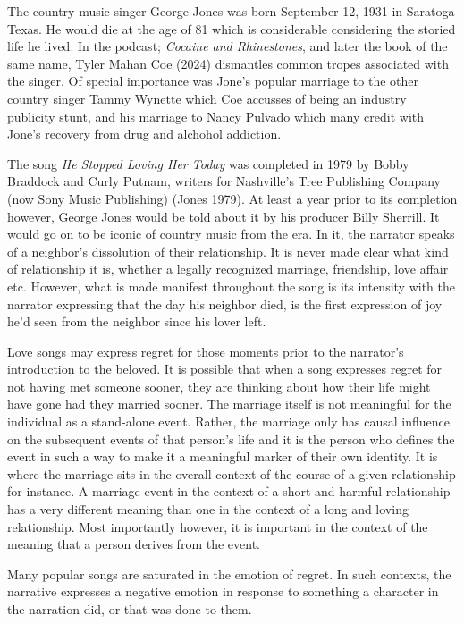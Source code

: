 \documentclass[
  letterpaper,
  DIV=11,
  numbers=noendperiod]{scrreprt}
\begin{document}
\begin{tcolorbox}[enhanced jigsaw, arc=.35mm, breakable, rightrule=.15mm, colback=white, colframe=quarto-callout-important-color-frame, bottomrule=.15mm, leftrule=.75mm, opacityback=0, toprule=.15mm, left=2mm]
\begin{tcolorbox}[enhanced jigsaw, arc=.35mm, breakable, rightrule=.15mm, colback=white, colframe=quarto-callout-tip-color-frame, bottomrule=.15mm, leftrule=.75mm, opacityback=0, toprule=.15mm, left=2mm]
The country music singer George Jones was born September 12, 1931 in
Saratoga Texas. He would die at the age of 81 which is considerable
considering the storied life he lived. In the podcast; \emph{Cocaine and
Rhinestones}, and later the book of the same name, Tyler Mahan Coe
(2024) dismantles common tropes associated with the singer. Of special
importance was Jone's popular marriage to the other country singer Tammy
Wynette which Coe accusses of being an industry publicity stunt, and his
marriage to Nancy Pulvado which many credit with Jone's recovery from
drug and alchohol addiction.

The song \emph{He Stopped Loving Her Today} was completed in 1979 by
Bobby Braddock and Curly Putnam, writers for Nashville's Tree Publishing
Company (now Sony Music Publishing) (Jones 1979). At least a year prior
to its completion however, George Jones would be told about it by his
producer Billy Sherrill. It would go on to be iconic of country music
from the era. In it, the narrator speaks of a neighbor's dissolution of
their relationship. It is never made clear what kind of relationship it
is, whether a legally recognized marriage, friendship, love affair etc.
However, what is made manifest throughout the song is its intensity with
the narrator expressing that the day his neighbor died, is the first
expression of joy he'd seen from the neighbor since his lover left.

Love songs may express regret for those moments prior to the narrator's
introduction to the beloved. It is possible that when a song expresses
regret for not having met someone sooner, they are thinking about how
their life might have gone had they married sooner. The marriage itself
is not meaningful for the individual as a stand-alone event. Rather, the
marriage only has causal influence on the subsequent events of that
person's life and it is the person who defines the event in such a way
to make it a meaningful marker of their own identity. It is where the
marriage sits in the overall context of the course of a given
relationship for instance. A marriage event in the context of a short
and harmful relationship has a very different meaning than one in the
context of a long and loving relationship. Most importantly however, it
is important in the context of the meaning that a person derives from
the event.

Many popular songs are saturated in the emotion of regret. In such
contexts, the narrative expresses a negative emotion in response to
something a character in the narration did, or that was done to them.


\end{tcolorbox}
\end{tcolorbox}
\end{document}
